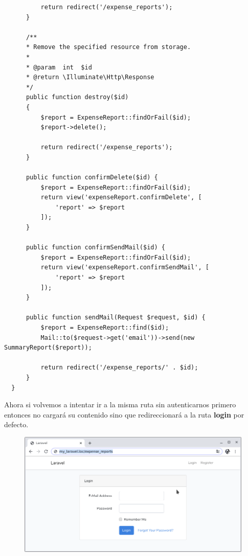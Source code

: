 \documentclass{article}
\begin{document}
\begin{verbatim}
          return redirect('/expense_reports');
      }

      /**
      * Remove the specified resource from storage.
      *
      * @param  int  $id
      * @return \Illuminate\Http\Response
      */
      public function destroy($id)
      {
          $report = ExpenseReport::findOrFail($id);
          $report->delete();

          return redirect('/expense_reports');
      }

      public function confirmDelete($id) {
          $report = ExpenseReport::findOrFail($id);
          return view('expenseReport.confirmDelete', [
              'report' => $report
          ]);
      }

      public function confirmSendMail($id) {
          $report = ExpenseReport::findOrFail($id);
          return view('expenseReport.confirmSendMail', [
              'report' => $report
          ]);
      }

      public function sendMail(Request $request, $id) {
          $report = ExpenseReport::find($id);
          Mail::to($request->get('email'))->send(new SummaryReport($report));

          return redirect('/expense_reports/' . $id);
      }
  }
\end{verbatim}

Ahora si volvemos a intentar ir a la misma ruta sin autenticarnos primero
entonces no cargará su contenido sino que redireccionará a la ruta
\textbf{login} por defecto.

\newpage

\begin{figure}[h!]
  \centering
  \includegraphics[scale=0.5]{./Pictures/132_exp_reports_protected.png}
\end{figure}
\end{document}

